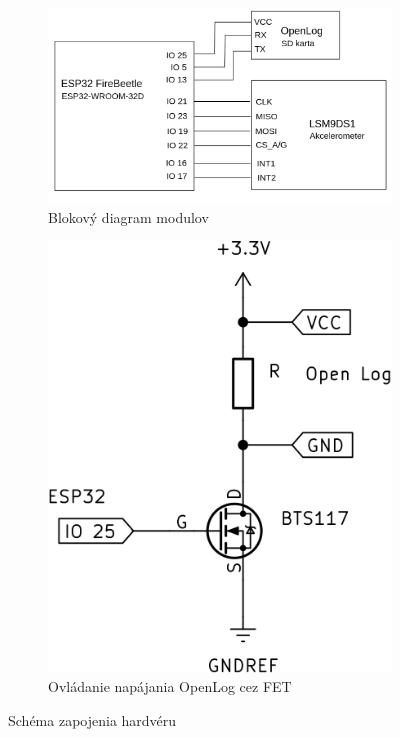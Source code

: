 \begin{figure}[h]
\centering
\begin{subfigure}[b]{0.65\textwidth}
    \centering
    \includegraphics[width=\textwidth]{figures/design/block-circuit-diagram.png}
    \caption{Blokový diagram modulov}
       \label{schematics:block}
\end{subfigure}
\hfill
\begin{subfigure}[b]{0.3\textwidth}
    \centering
    \includegraphics[width=\textwidth]{figures/design/fet.png}
    \caption{Ovládanie napájania OpenLog cez FET}
    \label{schematics:fet}
\end{subfigure}
\label{schematics}
\caption{Schéma zapojenia hardvéru}
\end{figure}
 
